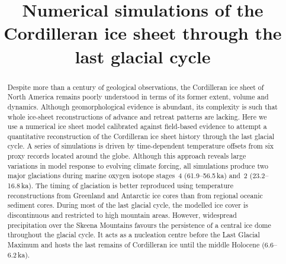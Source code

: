 \documentclass[tc, manuscript]{copernicus}
\begin{document}

\title{Numerical simulations of the Cordilleran ice sheet
       through the last glacial cycle}




\received{}
\pubdiscuss{}
\revised{}
\accepted{}
\published{}

\maketitle

\begin{abstract}

  Despite more than a century of geological observations, the Cordilleran ice
  sheet of North America remains poorly understood in terms of its former
  extent, volume and dynamics. Although geomorphological evidence is abundant,
  its complexity is such that whole ice-sheet reconstructions of advance and
  retreat patterns are lacking. Here we use a numerical ice sheet model
  calibrated against field-based evidence to attempt a quantitative
  reconstruction of the Cordilleran ice sheet history through the last glacial
  cycle. A series of simulations is driven by time-dependent temperature
  offsets from six proxy records located around the globe. Although this
  approach reveals large variations in model response to evolving climate
  forcing, all simulations produce two major glaciations during
  marine oxygen isotope stages~4 (61.9--56.5\,ka) and~2
  (23.2--16.8\,ka). The timing of glaciation is
  better reproduced using temperature reconstructions from Greenland and
  Antarctic ice cores than from regional oceanic sediment cores. During most of
  the last glacial cycle, the modelled ice cover is discontinuous and
  restricted to high mountain areas. However, widespread precipitation over the
  Skeena Mountains favours the persistence of a central ice dome throughout the
  glacial cycle. It acts as a nucleation centre before the Last Glacial Maximum
  and hosts the last remains of Cordilleran ice until the middle Holocene
  (6.6--6.2\,ka).

\end{abstract}
\end{document}
